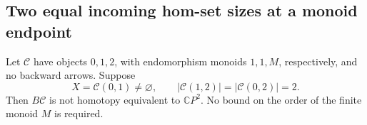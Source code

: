 \subsection{Two equal incoming hom-set sizes at a monoid endpoint}

\begin{proposition}\label{C:two-small-incoming-homs}
Let $\mathcal C$ have objects $0,1,2$, with endomorphism monoids
$1,1,M$, respectively, and no backward arrows.  Suppose
\[
 X=\mathcal C(0,1)\ne\varnothing,
 \qquad |\mathcal C(1,2)|=|\mathcal C(0,2)|=2.
\]
Then $B\mathcal C$ is not homotopy equivalent to $\mathbb CP^2$.
No bound on the order of the finite monoid $M$ is required.
\end{proposition}

